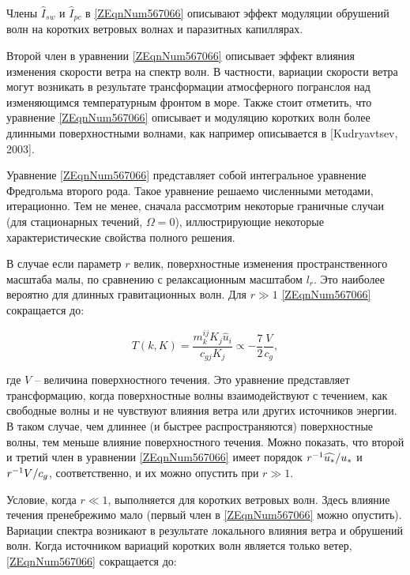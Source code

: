 Члены $\widehat{I}_{sw} $ и $\widehat{I}_{pc} $ в \eqref{ZEqnNum567066} описывают эффект модуляции обрушений волн на коротких ветровых волнах и паразитных капиллярах.

Второй член в уравнении \eqref{ZEqnNum567066} описывает эффект влияния изменения скорости ветра на спектр волн. В частности, вариации скорости ветра могут возникать в результате трансформации атмосферного погранслоя над изменяющимся температурным фронтом в море. Также стоит отметить, что уравнение \eqref{ZEqnNum567066} описывает и модуляцию коротких волн более длинными поверхностными волнами, как например описывается в [Kudryavtsev, 2003].

Уравнение \eqref{ZEqnNum567066} представляет собой интегральное уравнение Фредгольма второго рода. Такое уравнение решаемо численными методами, итерационно. Тем не менее, сначала рассмотрим некоторые граничные случаи (для стационарных течений, $\Omega =0$), иллюстрирующие некоторые характеристические свойства полного решения.

В случае если параметр $r$ велик, поверхностные изменения пространственного масштаба малы, по сравнению с релаксационным масштабом $l_{r} $. Это наиболее вероятно для длинных гравитационных волн. Для $r\gg 1$ \eqref{ZEqnNum567066} сокращается до:



\begin{equation} \label{1.40)} T\left(k,K\right)=\frac{m_{k}^{ij} K_{j} \widehat{u}_{i} }{c_{gj} K_{j} } \propto -\frac{7}{2} \frac{V}{c_{g} } ,  \end{equation} 



\noindent где $V$ -- величина поверхностного течения. Это уравнение представляет трансформацию, когда поверхностные волны взаимодействуют с течением, как свободные волны и не чувствуют влияния ветра или других источников энергии. В таком случае, чем длиннее (и быстрее распространяются) поверхностные волны, тем меньше влияние поверхностного течения. Можно показать, что второй и третий член в уравнении \eqref{ZEqnNum567066} имеет порядок $r^{-1} {\widehat{u_{*} }\mathord{\left/ {\vphantom {\widehat{u_{*} } u_{*} }} \right. \kern-\nulldelimiterspace} u_{*} } $ и $r^{-1} {V\mathord{\left/ {\vphantom {V c_{g} }} \right. \kern-\nulldelimiterspace} c_{g} } $, соответственно, и их можно опустить при $r\gg 1$.

Условие, когда $r\ll 1$, выполняется для коротких ветровых волн. Здесь влияние течения пренебрежимо мало (первый член в \eqref{ZEqnNum567066} можно опустить). Вариации спектра возникают в результате локального влияния ветра и обрушений волн. Когда источником вариаций коротких волн является только ветер, \eqref{ZEqnNum567066} сокращается до:

